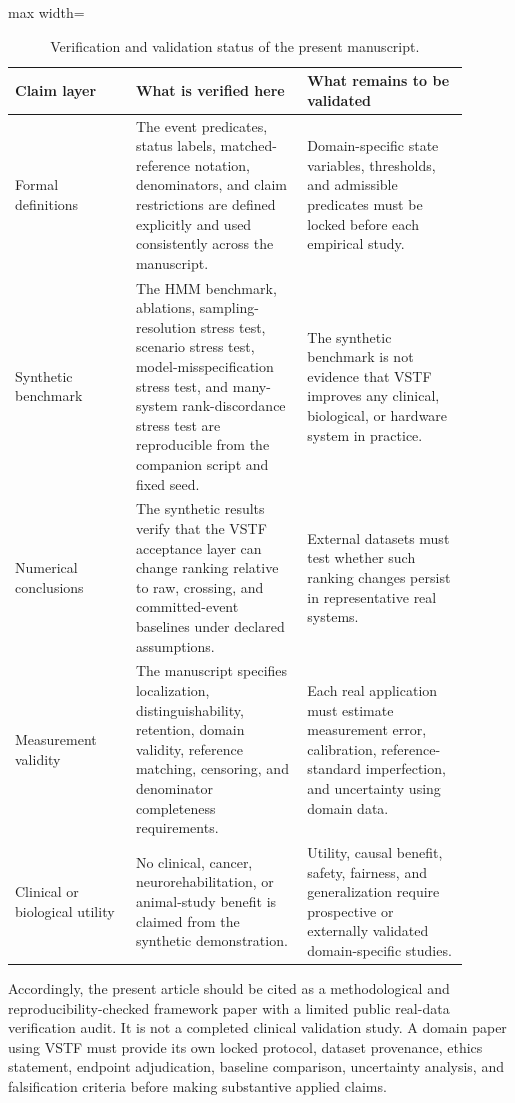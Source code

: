 \documentclass[11pt,a4paper]{article}
\newcommand{\1}{\mathbf{1}}
\begin{document}
\begin{table}[h]
\centering
\caption{Verification and validation status of the present manuscript.}
\label{tab:verification-status}
\small
\begin{adjustbox}{max width=\linewidth}
\begin{tabular}{p{0.24\linewidth}p{0.34\linewidth}p{0.32\linewidth}}
\toprule
Claim layer & What is verified here & What remains to be validated \\
\midrule
Formal definitions & The event predicates, status labels, matched-reference notation, denominators, and claim restrictions are defined explicitly and used consistently across the manuscript. & Domain-specific state variables, thresholds, and admissible predicates must be locked before each empirical study. \\
Synthetic benchmark & The HMM benchmark, ablations, sampling-resolution stress test, scenario stress test, model-misspecification stress test, and many-system rank-discordance stress test are reproducible from the companion script and fixed seed. & The synthetic benchmark is not evidence that VSTF improves any clinical, biological, or hardware system in practice. \\
Numerical conclusions & The synthetic results verify that the VSTF acceptance layer can change ranking relative to raw, crossing, and committed-event baselines under declared assumptions. & External datasets must test whether such ranking changes persist in representative real systems. \\
Measurement validity & The manuscript specifies localization, distinguishability, retention, domain validity, reference matching, censoring, and denominator completeness requirements. & Each real application must estimate measurement error, calibration, reference-standard imperfection, and uncertainty using domain data. \\
Clinical or biological utility & No clinical, cancer, neurorehabilitation, or animal-study benefit is claimed from the synthetic demonstration. & Utility, causal benefit, safety, fairness, and generalization require prospective or externally validated domain-specific studies. \\
\bottomrule
\end{tabular}
\end{adjustbox}
\end{table}

Accordingly, the present article should be cited as a methodological and reproducibility-checked framework paper with a limited public real-data verification audit. It is not a completed clinical validation study. A domain paper using VSTF must provide its own locked protocol, dataset provenance, ethics statement, endpoint adjudication, baseline comparison, uncertainty analysis, and falsification criteria before making substantive applied claims.
\end{document}
